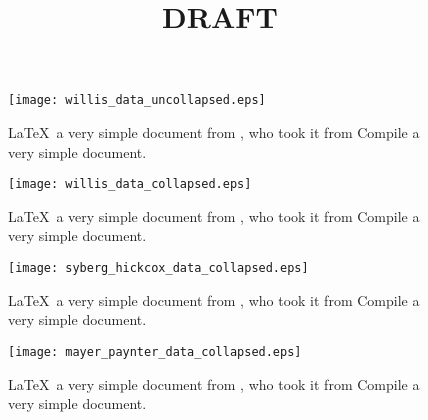 \documentclass{article}
\begin{document}
\ifdraft
	\title{DRAFT}
	\maketitle
\else
\frontmatter
\fi

	\tableofcontents

\ifdraft
\else
\mainmatter
\fi

\pagebreak
\begin{figure}[htbp]
 \begin{center}
    \texttt{[image: willis\_data\_uncollapsed.eps]}
     \caption{\LaTeX\ a very simple document from \cite{Slater2012}, who took it from \cite{Willis1995} Compile a very simple document.}
     \label{fig:asdfasdfdf}
 \end{center}
\end{figure}

\begin{figure}[htbp]
 \begin{center}
    \texttt{[image: willis\_data\_collapsed.eps]}
     \caption{\LaTeX\ a very simple document from \cite{Slater2012}, who took it from \cite{Willis1995} Compile a very simple document.}
     \label{fig:asdfsdf}
 \end{center}
\end{figure}

\begin{figure}[htbp]
 \begin{center}
    \texttt{[image: syberg\_hickcox\_data\_collapsed.eps]}
     \caption{\LaTeX\ a very simple document from \cite{Slater2012}, who took it from \cite{Willis1995} Compile a very simple document.}
     \label{fig:asdfasdf}
 \end{center}
\end{figure}

\begin{figure}[htbp]
 \begin{center}
    \texttt{[image: mayer\_paynter\_data\_collapsed.eps]}
     \caption{\LaTeX\ a very simple document from \cite{Slater2012}, who took it from \cite{Willis1995} Compile a very simple document.}
     \label{fig:asdf}
 \end{center}
\end{figure}

\pagebreak
\ifdraft
 	\printbibliography
\else
	\backmatter
\fi
\end{document}
